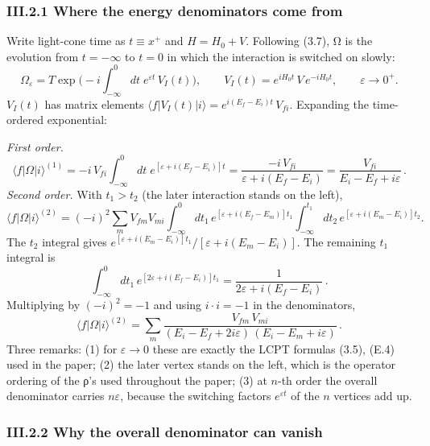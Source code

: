 \subsubsection*{III.2.1 Where the energy denominators come from}

Write light-cone time as $t\equiv x^+$ and $H=H_0+V$. Following (3.7), Ω is the evolution from $t=-\infty$ to $t=0$ in which the interaction is switched on slowly:
\begin{equation}
\Omega_\varepsilon=T\exp\!\Big(-i\int_{-\infty}^0 dt\;e^{\varepsilon t}\,V_I(t)\Big),\qquad V_I(t)=e^{iH_0t}\,V\,e^{-iH_0t},\qquad \varepsilon\to0^+.
\label{III:adiab}
\end{equation}
$V_I(t)$ has matrix elements $\langle f|V_I(t)|i\rangle=e^{i(E_f-E_i)t}\,V_{fi}$. Expanding the time-ordered exponential:

\emph{First order.}
\begin{equation}
\langle f|\Omega|i\rangle^{(1)}=-i\,V_{fi}\int_{-\infty}^0\! dt\;e^{[\varepsilon+i(E_f-E_i)]t}=\frac{-i\,V_{fi}}{\varepsilon+i(E_f-E_i)}=\frac{V_{fi}}{E_i-E_f+i\varepsilon}\,.
\label{III:w1}
\end{equation}
\emph{Second order.} With $t_1>t_2$ (the later interaction stands on the left),
\[
\langle f|\Omega|i\rangle^{(2)}=(-i)^2\sum_m V_{fm}V_{mi}\int_{-\infty}^0\! dt_1\,e^{[\varepsilon+i(E_f-E_m)]t_1}\int_{-\infty}^{t_1}\! dt_2\,e^{[\varepsilon+i(E_m-E_i)]t_2}.
\]
The $t_2$ integral gives $e^{[\varepsilon+i(E_m-E_i)]t_1}/[\varepsilon+i(E_m-E_i)]$. The remaining $t_1$ integral is
\[
\int_{-\infty}^0 dt_1\,e^{[2\varepsilon+i(E_f-E_i)]t_1}=\frac{1}{2\varepsilon+i(E_f-E_i)}\,.
\]
Multiplying by $(-i)^2=-1$ and using $i\cdot i=-1$ in the denominators,
\begin{equation}
\langle f|\Omega|i\rangle^{(2)}=\sum_m\frac{V_{fm}\,V_{mi}}{(E_i-E_f+2i\varepsilon)\,(E_i-E_m+i\varepsilon)}\,.
\label{III:w2}
\end{equation}
Three remarks: (1) for $\varepsilon\to0$ these are exactly the LCPT formulas (3.5), (E.4) used in the paper; (2) the later vertex stands on the left, which is the operator ordering of the ρ's used throughout the paper; (3) at $n$-th order the overall denominator carries $n\varepsilon$, because the switching factors $e^{\varepsilon t}$ of the $n$ vertices add up.

\subsubsection*{III.2.2 Why the overall denominator can vanish}

